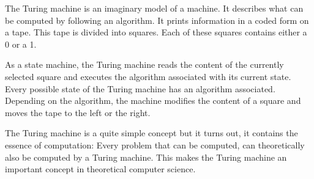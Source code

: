 
The Turing machine is an imaginary model of a machine. It describes what can be computed by following an algorithm. It prints information in a coded form on a tape. This tape is divided into squares. Each of these squares contains either a 0 or a 1.

As a state machine, the Turing machine reads the content of the currently selected square and executes the algorithm associated with its current state. Every possible state of the Turing machine has an algorithm associated. Depending on the algorithm, the machine modifies the content of a square and moves the tape to the left or the right.

The Turing machine is a quite simple concept but it turns out, it contains the essence of computation: Every problem that can be computed, can theoretically also be computed by a Turing machine. This makes the Turing machine an important concept in theoretical computer science.

